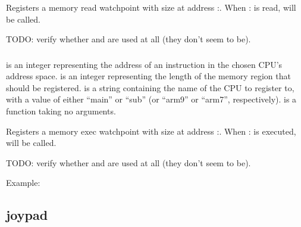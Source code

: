 \documentclass[letterpaper,10pt,english]{sphinxmanual}
\begin{document}
\sphinxAtStartPar
Registers a memory read watchpoint with size  at address :. When : is read,  will be called.

\sphinxAtStartPar
TODO: verify whether  and  are used at all (they don’t seem to be).


\subsubsection{}
\label{\detokenize{mods:memory-registerexec-address-size-2-cpuname-main-func}}\label{\detokenize{mods:registerexec}}
\sphinxAtStartPar
{} is an integer representing the address of an instruction in the chosen CPU’s address space.  is an integer representing the length of the memory region that should be registered.  is a string containing the name of the CPU to register to, with a value of either “main” or “sub” (or “arm9” or “arm7”, respectively).  is a function taking no arguments.

\sphinxAtStartPar
Registers a memory exec watchpoint with size  at address :. When : is executed,  will be called.

\sphinxAtStartPar
TODO: verify whether  and  are used at all (they don’t seem to be).

\sphinxAtStartPar
Example:

\begin{sphinxVerbatim}[commandchars=\\\{\}]
 
\end{sphinxVerbatim}


\subsection{joypad}
\label{\detokenize{mods:joypad}}\label{\detokenize{mods:id6}}
\end{document}
